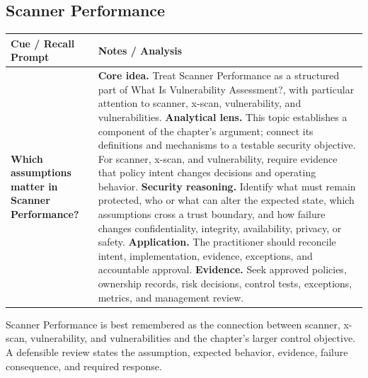\documentclass[11pt]{article}
\newcommand{\CornellHeader}{%
\rowcolor{Navy}\color{white}\bfseries Cue / Recall Prompt & \color{white}\bfseries Notes / Analysis\\\hline}
\newcommand{\CornellRow}[2]{%
\cellcolor{CueGray}\RaggedRight\textbf{#1} & \RaggedRight #2\\\hline}
\begin{document}
\subsection*{Scanner Performance}
\begin{longtable}{>{\RaggedRight\arraybackslash}p{}|>{\RaggedRight\arraybackslash}p{}}
\CornellHeader
\CornellRow{Which assumptions matter in Scanner Performance?}{\textbf{Core idea.} Treat Scanner Performance as a structured part of What Is Vulnerability Assessment?, with particular attention to scanner, x-scan, vulnerability, and vulnerabilities. \textbf{Analytical lens.} This topic establishes a component of the chapter's argument; connect its definitions and mechanisms to a testable security objective. For scanner, x-scan, and vulnerability, require evidence that policy intent changes decisions and operating behavior. \textbf{Security reasoning.} Identify what must remain protected, who or what can alter the expected state, which assumptions cross a trust boundary, and how failure changes confidentiality, integrity, availability, privacy, or safety. \textbf{Application.} The practitioner should reconcile intent, implementation, evidence, exceptions, and accountable approval. \textbf{Evidence.} Seek approved policies, ownership records, risk decisions, control tests, exceptions, metrics, and management review.}
\end{longtable}
\begin{topicsummary}
Scanner Performance is best remembered as the connection between scanner, x-scan, vulnerability, and vulnerabilities and the chapter's larger control objective. A defensible review states the assumption, expected behavior, evidence, failure consequence, and required response.
\end{topicsummary}
\end{document}
